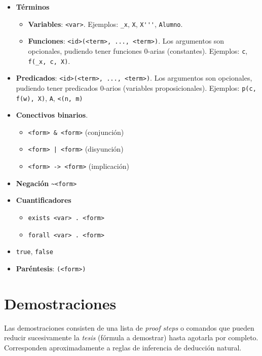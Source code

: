 \begin{itemize}
    \item \textbf{Términos}
    \begin{itemize}
        \item \textbf{Variables}: \lstinline{<var>}. Ejemplos: \lstinline{_x},
        \lstinline{X}, \lstinline{X'''}, \lstinline{Alumno}.
        \item \textbf{Funciones}: \lstinline{<id>(<term>, ..., <term>)}. Los
        argumentos son opcionales, pudiendo tener funciones 0-arias
        (constantes). Ejemplos:  \lstinline{c}, \lstinline{f(_x, c, X)}.
    \end{itemize}
    \item \textbf{Predicados}: \lstinline{<id>(<term>, ..., <term>)}. Los
    argumentos son opcionales, pudiendo tener predicados 0-arios (variables
    proposicionales). Ejemplos: \lstinline{p(c, f(w), X)}, \lstinline{A},
    \lstinline{<(n, m)}
    \item \textbf{Conectivos binarios}.
    \begin{itemize}
        \item \lstinline{<form> & <form>} (conjunción)
        \item \lstinline{<form> | <form>} (disyunción)
        \item \lstinline{<form> -> <form>} (implicación)
    \end{itemize}
    \item \textbf{Negación} \lstinline{~<form>}
    \item \textbf{Cuantificadores}
    \begin{itemize}
        \item \lstinline{exists <var> . <form>}
        \item \lstinline{forall <var> . <form>}
    \end{itemize}
    \item \lstinline{true}, \lstinline{false}
    \item \textbf{Paréntesis}: \lstinline{(<form>)}
\end{itemize}


\section{Demostraciones}

Las demostraciones consisten de una lista de \textit{proof steps} o comandos que
pueden reducir sucesivamente la \textit{tesis} (fórmula a demostrar) hasta
agotarla por completo. Corresponden aproximadamente a reglas de inferencia de
deducción natural.

